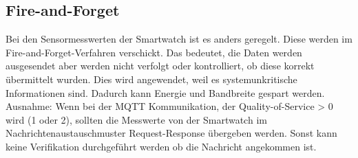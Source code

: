 \subsection{Fire-and-Forget}
Bei den Sensormesswerten der Smartwatch ist es anders geregelt. Diese werden im Fire-and-Forget-Verfahren verschickt. Das bedeutet, die Daten werden ausgesendet aber werden nicht verfolgt oder kontrolliert, ob diese korrekt übermittelt wurden. Dies wird angewendet, weil es systemunkritische Informationen sind. Dadurch kann Energie und Bandbreite gespart werden. Ausnahme: Wenn bei der \gls{MQTT} Kommunikation, der Quality-of-Service > 0 wird (1 oder 2), sollten die Messwerte von der Smartwatch im Nachrichtenaustauschmuster Request-Response übergeben werden. Sonst kann keine Verifikation durchgeführt werden ob die Nachricht angekommen ist.

